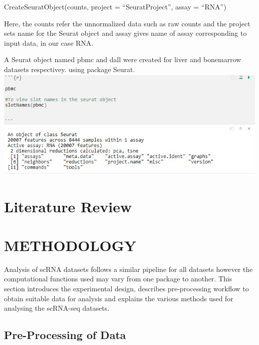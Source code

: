 \documentclass{sydneythesis}
\begin{document}
CreateSeuratObject(counts, project = ``SeuratProject'', assay = ``RNA'')

Here, the counts refer the unnormalized data such as raw counts and the
project sets name for the Seurat object and assay gives name of assay
corresponding to input data, in our case RNA.

A Seurat object named pbmc and dall were created for liver and
bonemarrow datasets respectivey. using package Seurat.
\includegraphics[scale=1.1]{seuratslots.JPG}

\chapter{Literature Review}\label{literature-review}

\chapter{METHODOLOGY}\label{ch:methods}

Analysis of scRNA datasets follows a similar pipeline for all datasets
however the computational functions used may vary from one package to
another. This section introduces the experimental design, describes
pre-processing workflow to obtain suitable data for analysis and
explains the various methods used for analysing the scRNA-seq datasets.

\section{Pre-Processing of Data}\label{sec:Pre-pro}
\end{document}
